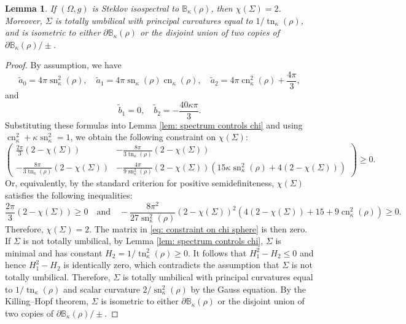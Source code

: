 \documentclass[11pt]{amsart}
\newcommand{\sn}{\operatorname{sn}}
\newcommand{\cn}{\operatorname{cn}}
\newcommand{\tn}{\operatorname{tn}}
\newtheorem{lemma}[theorem]{Lemma}
\theoremstyle{definition}
\numberwithin{equation}{section}
\begin{document}
\begin{lemma}
    \label{lem: spectrum controls chi sphere}
    If $(\Omega,g)$ is Steklov isospectral to $\mathbb B_\kappa(\rho)$, then $\chi(\Sigma) = 2$. Moreover, $\Sigma$ is totally umbilical with principal curvatures equal to $1/\tn_\kappa(\rho)$, and is isometric to either $\partial\mathbb B_\kappa(\rho)$ or the disjoint union of two copies of $\partial\mathbb B_\kappa(\rho)/\pm$. 
\end{lemma}
\begin{proof}
    By assumption, we have 
    \begin{equation}
    \label{eq: H2 is nonnegative}
        \tilde a_0 = 4\pi \sn_\kappa^2(\rho),\quad \tilde a_1 = 4\pi \sn_\kappa(\rho)\cn_\kappa(\rho),\quad \tilde a_2 = 4\pi \cn_\kappa^2(\rho) + \frac{4\pi}{3},
    \end{equation}
    and
    \[\tilde b_1 = 0,\quad \tilde b_2 = -\frac{40\kappa\pi}{3}.\]
    Substituting these formulas into Lemma \ref{lem: spectrum controls chi} and using $\cn_\kappa^2 + \kappa \sn_\kappa^2 = 1$, we obtain the following constraint on $\chi(\Sigma)$:
    \begin{equation}
        \label{eq: constraint on chi sphere}
        \begin{pmatrix}
            \frac{2\pi}{3}(2-\chi(\Sigma)) & -\frac{8\pi}{3\tn_\kappa(\rho)}\left(2-\chi(\Sigma)\right)\\
            -\frac{8\pi}{3\tn_\kappa(\rho)}\left(2-\chi(\Sigma)\right) & -\frac{4\pi}{9\sn_\kappa^2(\rho)}(2-\chi(\Sigma))(15\kappa \sn_\kappa^2(\rho) + 4(2-\chi(\Sigma)))
        \end{pmatrix}
        \ge 0. 
    \end{equation}
    Or, equivalently, by the standard criterion for positive semidefiniteness, $\chi(\Sigma)$ satisfies the following inequalities:
    \[\frac{2\pi}{3}(2-\chi(\Sigma))\ge 0\quad\text{and}\quad -\frac{8\pi^2}{27\sn_\kappa^2(\rho)}(2-\chi(\Sigma))^2(4(2-\chi(\Sigma)) + 15 + 9\cn_\kappa^2(\rho))\ge0.\]
    Therefore, $\chi(\Sigma) = 2$. 
    The matrix in \eqref{eq: constraint on chi sphere} is then zero. If $\Sigma$ is not totally umbilical, by Lemma \ref{lem: spectrum controls chi}, $\Sigma$ is minimal and has constant $H_2 = 1/\tn_\kappa^2(\rho)\ge 0$. It follows that $H_1^2 - H_2\le 0$ and hence $H_1^2 - H_2$ is identically zero, which contradicts the assumption that $\Sigma$ is not totally umbilical. Therefore, $\Sigma$ is totally umbilical with principal curvatures equal to $1/\tn_\kappa(\rho)$ and scalar curvature $2/\sn^2_\kappa(\rho)$ by the Gauss equation.  
    By the Killing--Hopf theorem, $\Sigma$ is isometric to either $\partial\mathbb B_\kappa(\rho)$ or the disjoint union of two copies of $\partial\mathbb B_\kappa(\rho)/\pm$.
\end{proof}
\end{document}
